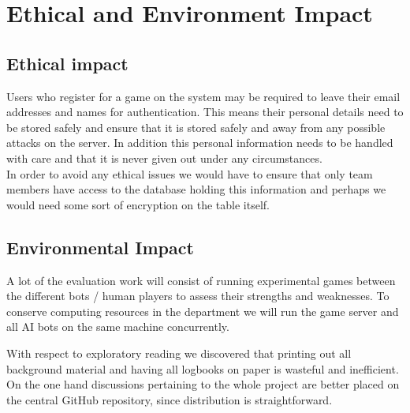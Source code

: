 \documentclass[12pt]{article}
\begin{document}
\section{Ethical and Environment Impact}

\subsection{Ethical impact}

Users who register for a game on the system may be required to leave
their email addresses and names for authentication. This means their
personal details need to be stored safely and ensure that it is stored
safely and away from any possible attacks on the server. In addition
this personal information needs to be handled with care and that it
is never given out under any circumstances.\\
In order to avoid any ethical issues we would have to ensure that
only team members have access to the database holding this information
and perhaps we would need some sort of encryption on the table itself.

\subsection{Environmental Impact }

A lot of the evaluation work will consist of running experimental
games between the different bots / human players to assess their 
strengths and weaknesses. To conserve computing resources in the 
department we will run the game server and all AI bots on the same
machine concurrently. 

With respect to exploratory reading we discovered that printing
out all background material and having all logbooks on paper is wasteful
and inefficient. On the one hand discussions pertaining to the
whole project are better placed on the central GitHub repository, since 
distribution is straightforward. 

\end{document}
